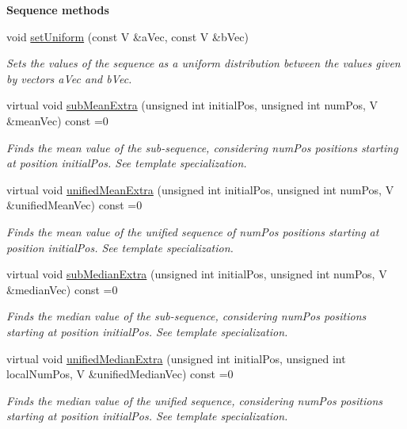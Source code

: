 \begin{Indent}{\bf Sequence methods}
\begin{DoxyCompactItemize}
void \hyperlink{class_q_u_e_s_o_1_1_base_vector_sequence_a96d44e7dd53a077a4c7be73f008b351e}{set\-Uniform} (const V \&a\-Vec, const V \&b\-Vec)
\begin{DoxyCompactList}\small\item\em Sets the values of the sequence as a uniform distribution between the values given by vectors {\ttfamily a\-Vec} and {\ttfamily b\-Vec}. \end{DoxyCompactList}\item 
virtual void \hyperlink{class_q_u_e_s_o_1_1_base_vector_sequence_ab36f3e2511108259c272d8a148452505}{sub\-Mean\-Extra} (unsigned int initial\-Pos, unsigned int num\-Pos, V \&mean\-Vec) const =0
\begin{DoxyCompactList}\small\item\em Finds the mean value of the sub-\/sequence, considering {\ttfamily num\-Pos} positions starting at position {\ttfamily initial\-Pos}. See template specialization. \end{DoxyCompactList}\item 
virtual void \hyperlink{class_q_u_e_s_o_1_1_base_vector_sequence_a6ee252d07395644a9175aabf2bad7aed}{unified\-Mean\-Extra} (unsigned int initial\-Pos, unsigned int num\-Pos, V \&unified\-Mean\-Vec) const =0
\begin{DoxyCompactList}\small\item\em Finds the mean value of the unified sequence of {\ttfamily num\-Pos} positions starting at position {\ttfamily initial\-Pos}. See template specialization. \end{DoxyCompactList}\item 
virtual void \hyperlink{class_q_u_e_s_o_1_1_base_vector_sequence_a80caa77a7258c3ae44b6320846cfe29d}{sub\-Median\-Extra} (unsigned int initial\-Pos, unsigned int num\-Pos, V \&median\-Vec) const =0
\begin{DoxyCompactList}\small\item\em Finds the median value of the sub-\/sequence, considering {\ttfamily num\-Pos} positions starting at position {\ttfamily initial\-Pos}. See template specialization. \end{DoxyCompactList}\item 
virtual void \hyperlink{class_q_u_e_s_o_1_1_base_vector_sequence_ab3b300eb093fe8d726996db5726e59e4}{unified\-Median\-Extra} (unsigned int initial\-Pos, unsigned int local\-Num\-Pos, V \&unified\-Median\-Vec) const =0
\begin{DoxyCompactList}\small\item\em Finds the median value of the unified sequence, considering {\ttfamily num\-Pos} positions starting at position {\ttfamily initial\-Pos}. See template specialization. \end{DoxyCompactList}\item 

\end{DoxyCompactItemize}
\end{Indent}
